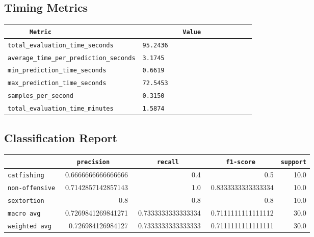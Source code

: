 \documentclass{article}
\begin{document}
\subsection{Timing Metrics}

\begin{center}
\begin{tabular}{l | l} \hline
    \verb|      Metric     | & \verb|           Value           | \\ \hline
    \hline
    \verb|total_evaluation_time_seconds| & \verb|95.2436                      | \\ \hline
    \verb|average_time_per_prediction_seconds| & \verb|3.1745                       | \\ \hline
    \verb|min_prediction_time_seconds| & \verb|0.6619                       | \\ \hline
    \verb|max_prediction_time_seconds| & \verb|72.5453                      | \\ \hline
    \verb|samples_per_second| & \verb|0.3150                       | \\ \hline
    \verb|total_evaluation_time_minutes| & \verb|1.5874                       | \\ \hline
\end{tabular}
\end{center}

\subsection{Classification Report}

\begin{center}
\begin{tabular}{l | r | r | r | r} \hline
    \verb|            | & \verb|    precision     | & \verb|      recall      | & \verb|     f1-score     | & \verb|support| \\ \hline
    \hline
    \verb|catfishing | & 0.6666666666666666 & 0.4 & 0.5 &    10.0 \\ \hline
    \verb|non-offensive| & 0.7142857142857143 & 1.0 & 0.8333333333333334 &    10.0 \\ \hline
    \verb|sextortion | & 0.8 & 0.8 & 0.8 &    10.0 \\ \hline
    \verb|macro avg  | & 0.7269841269841271 & 0.7333333333333334 & 0.7111111111111112 &    30.0 \\ \hline
    \verb|weighted avg| & 0.726984126984127 & 0.7333333333333333 & 0.7111111111111111 &    30.0 \\ \hline
\end{tabular}
\end{center}
\end{document}
